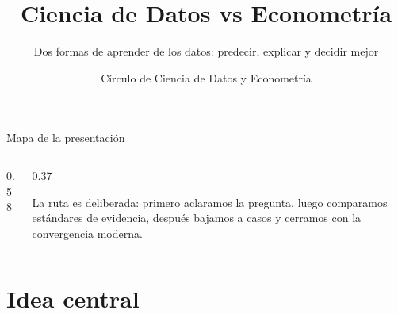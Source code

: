 \documentclass[aspectratio=169,11pt,table]{beamer}
\title{Ciencia de Datos vs Econometría}
\subtitle{Dos formas de aprender de los datos: predecir, explicar y decidir mejor}
\author{Círculo de Ciencia de Datos y Econometría}
\date{}
\begin{document}


\begin{frame}{Mapa de la presentación}
\begin{columns}[T,onlytextwidth]
\begin{column}{0.58\textwidth}
\tableofcontents
\end{column}
\begin{column}{0.37\textwidth}
\begin{keybox}
\small
La ruta es deliberada: primero aclaramos la pregunta, luego comparamos estándares de evidencia, después bajamos a casos y cerramos con la convergencia moderna.
\end{keybox}
\end{column}
\end{columns}
\end{frame}

\section{Idea central}
\end{document}
